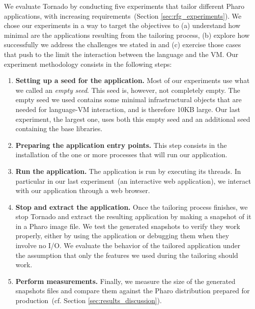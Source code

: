 %
We evaluate Tornado by conducting five experiments that tailor different Pharo applications, with increasing requirements~(Section \ref{sec:rfg_experiments}). We chose our experiments in a way to target the objectives to (a) understand how minimal are the applications resulting from the tailoring process, (b) explore how successfully we address the challenges we stated in  and (c) exercise those cases that push to the limit the interaction between the language and the VM. Our experiment methodology consists in the following steps:

\begin{enumerate}
\item \textbf{Setting up a seed for the application.} Most of our experiments use what we called an \emph{empty seed}. This seed is, however, not completely empty. The empty seed we used contains some minimal infrastructural objects that are needed for language-VM interaction, and is therefore 10KB large. Our last experiment, the largest one, uses both this empty seed and an additional seed containing the base libraries. 
\item \textbf{Preparing the application entry points.} This step consists in the installation of the one or more processes that will run our application.
\item \textbf{Run the application.} The application is run by executing its threads. In particular in our last experiment~(an interactive web application), we interact with our application through a web browser. 
\item \textbf{Stop and extract the application.} Once the tailoring process finishes, we stop Tornado and extract the resulting application by making a snapshot of it in a Pharo image file. We test the generated snapshots to verify they work properly, either by using the application or debugging them when they involve no I/O. We evaluate the behavior of the tailored application under the assumption that only the features we used during the tailoring should work.
\item \textbf{Perform measurements.} Finally, we measure the size of the generated snapshots files and compare them against the Pharo distribution prepared for production~(cf. Section \ref{sec:results_discussion}).
\end{enumerate}

